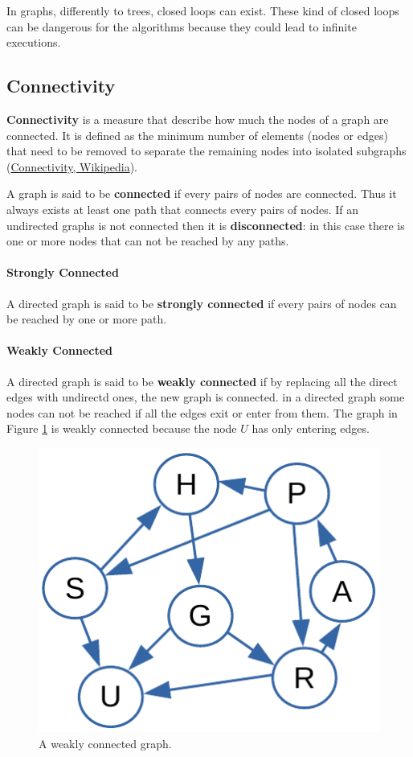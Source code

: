 In graphs, differently to trees, closed loops can exist. These kind of closed loops can be dangerous for the algorithms because they could lead to infinite executions.

\subsection{Connectivity}
\textbf{Connectivity} is a measure that describe how much the nodes of a graph are connected. It is defined as the minimum number of elements (nodes or edges) that need to be removed to separate the remaining nodes into isolated subgraphs \cite{wikiconnectivity} (\href{https://en.wikipedia.org/wiki/Connectivity_(graph_theory)}{Connectivity, Wikipedia}).

A graph is said to be \textbf{connected} if every pairs of nodes are connected. Thus it always exists at least one path that connects every pairs of nodes. If an undirected graphs is not connected then it is \textbf{disconnected}: in this case there is one or more nodes that can not be reached by any paths.

\paragraph{Strongly Connected}
A directed graph is said to be \textbf{strongly connected} if every pairs of nodes can be reached by one or more path.

\paragraph{Weakly Connected}
A directed graph is said to be \textbf{weakly connected} if by replacing all the direct edges with undirectd ones, the new graph is connected. in a directed graph some nodes can not be reached if all the edges exit or enter from them. The graph in Figure \ref{graphs_2} is weakly connected because the node \(U\) has only entering edges.

\begin{figure}[H]
	\begin{center}
		\includegraphics[scale=.6]{chapters/graphs/images/graphs_2.pdf}
		\caption[A weakly connected graph.]{A weakly connected graph.}
		\label{graphs_2}
	\end{center}
\end{figure}


